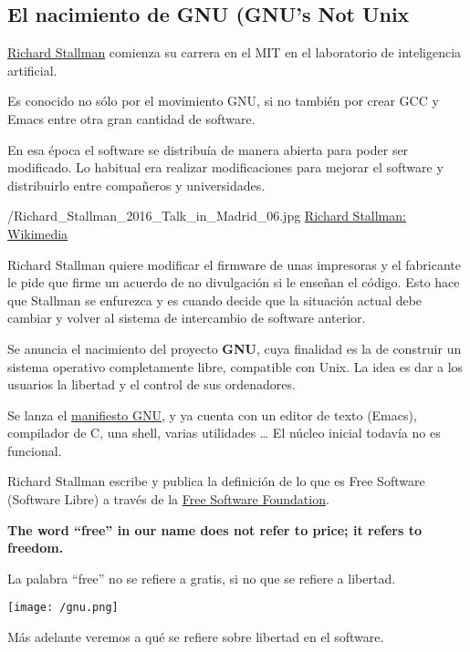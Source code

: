 \subsection{El nacimiento de GNU (GNU's Not Unix}
\begin{description}

\item[1971]\href{https://en.wikipedia.org/wiki/Richard_Stallman}{Richard Stallman} comienza su carrera en el MIT en el laboratorio de inteligencia artificial.

Es conocido no sólo por el movimiento GNU, si no también por crear GCC y Emacs entre otra gran cantidad de software.

En esa época el software se distribuía de manera abierta para poder ser modificado. Lo habitual era realizar modificaciones para mejorar el software y distribuirlo entre compañeros y universidades.

  {/Richard_Stallman_2016_Talk_in_Madrid_06.jpg}
  {\href{https://commons.wikimedia.org/wiki/File:Richard_Stallman_2016_Talk_in_Madrid_06.jpg}{Richard Stallman: Wikimedia}}
  {
Richard Stallman quiere modificar el firmware de unas impresoras y el fabricante le pide que firme un acuerdo de no divulgación si le enseñan el código. Esto hace que Stallman se enfurezca y es cuando decide que la situación actual debe cambiar y volver al sistema de intercambio de software anterior.

\item[1983] Se anuncia el nacimiento del proyecto \textbf{GNU}, cuya finalidad es la de construir un sistema operativo completamente libre, compatible con Unix. La idea es dar a los usuarios la libertad y el control de sus ordenadores.

\item[1985] Se lanza el \href{https://www.gnu.org/gnu/manifesto.es.html}{manifiesto GNU}, y ya cuenta con un editor de texto (Emacs), compilador de C, una shell, varias utilidades … El núcleo inicial todavía no es funcional.
}


\item[1986]
Richard Stallman escribe y publica la definición de lo que es Free Software (Software Libre) a través de la \href{https://es.wikipedia.org/wiki/Free_Software_Foundation}{Free Software Foundation}.

\begin{tcolorbox}[title=Aclarando la palabra “free”:,sidebyside,righthand width=0.12\linewidth]

\textbf{The word “free” in our name does not refer to price; it refers to freedom.}

La palabra “free” no se refiere a gratis, si no que se refiere a libertad.

\tcblower
\texttt{[image: /gnu.png]}
\end{tcolorbox}

Más adelante veremos a qué se refiere sobre libertad en el software.

\end{description}


